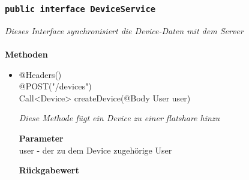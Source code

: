 	\subsubsection{\texttt{public interface DeviceService }}
\textit{Dieses Interface synchronisiert die Device-Daten mit dem Server}\\
\\
	\textbf{Methoden} \\
		\begin{itemize}
		\item{@Headers()\\@POST("/devices") \\ Call<Device> createDevice(@Body User user)}

		\textit{Diese Methode fügt ein Device zu einer flatshare hinzu}

		\textbf{Parameter} \\
	 user - der zu dem Device zugehörige User 

		\textbf{Rückgabewert} \\


	 \end{itemize}




